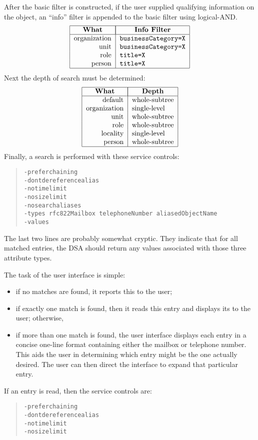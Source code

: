 After the basic filter is constructed,
if the user supplied qualifying information on the object,
an ``info'' filter is appended to the basic filter using logical-AND.
\[\begin{tabular}{|r|l|}
\hline
\multicolumn{1}{|c|}{\bf What}&
		\multicolumn{1}{|c|}{\bf Info Filter}\\
\hline
organization&	\tt businessCategory=X\\
unit&		\tt businessCategory=X\\
role&		\tt title=X\\
person&		\tt title=X\\
\hline
\end{tabular}\]
Next the depth of search must be determined:
\[\begin{tabular}{|r|l|}
\hline
\multicolumn{1}{|c|}{\bf What}&
		\multicolumn{1}{|c|}{\bf Depth}\\
\hline
default&	whole-subtree\\
organization&	single-level\\
unit&		whole-subtree\\
role&		whole-subtree\\
locality&	single-level\\
person&		whole-subtree\\
\hline
\end{tabular}\]
Finally,
a search is performed with these service controls:
\begin{quote}\small\begin{verbatim}
-preferchaining
-dontdereferencealias
-notimelimit
-nosizelimit
-nosearchaliases
-types rfc822Mailbox telephoneNumber aliasedObjectName
-values
\end{verbatim}\end{quote}
The last two lines are probably somewhat cryptic.
They indicate that for all matched entries,
the DSA should return any values associated with those three attribute types.

The task of the user interface is simple:
\begin{itemize}
\item	if no matches are found,
	it reports this to the user;

\item	if exactly one match is found,
	then it reads this entry and displays its to the user;
	otherwise,

\item	if more than one match is found,
	the user interface displays each entry in a concise one-line format
	containing either the mailbox or telephone number.
	This aids the user in determining which entry might be the one
	actually desired.
	The user can then direct the interface to expand that particular entry.
\end{itemize}
If an entry is read,
then the service controls are:
\begin{quote}\small\begin{verbatim}
-preferchaining
-dontdereferencealias
-notimelimit
-nosizelimit
\end{verbatim}\end{quote}

